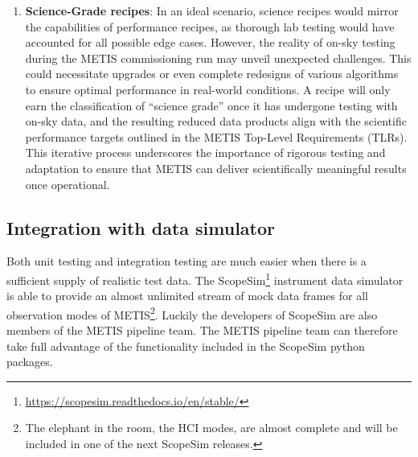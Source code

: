\documentclass[a4paper]{spie}  %
\begin{document}
\begin{enumerate}
     \item \textbf{Science-Grade recipes}: In an ideal scenario, science recipes would mirror the capabilities of performance recipes, as thorough lab testing would have accounted for all possible edge cases. However, the reality of on-sky testing during the METIS commissioning run may unveil unexpected challenges. This could necessitate upgrades or even complete redesigns of various algorithms to ensure optimal performance in real-world conditions. A recipe will only earn the classification of ``science grade'' once it has undergone testing with on-sky data, and the resulting reduced data products align with the scientific performance targets outlined in the METIS Top-Level Requirements (TLRs). This iterative process underscores the importance of rigorous testing and adaptation to ensure that METIS can deliver scientifically meaningful results once operational. 
 \end{enumerate}


\subsection{Integration with data simulator}
\label{subsec:imp_sim}

Both unit testing and integration testing are much easier when there is a sufficient supply of realistic test data.
The ScopeSim\footnote{\url{https://scopesim.readthedocs.io/en/stable/}} instrument data simulator\cite{scopesim} is able to provide an almost unlimited stream of mock data frames for all observation modes of METIS\footnote{The elephant in the room, the HCI modes, are almost complete and will be included in one of the next ScopeSim releases.}.
Luckily the developers of ScopeSim are also members of the METIS pipeline team.
The METIS pipeline team can therefore take full advantage of the functionality included in the ScopeSim python packages.
\end{document}
